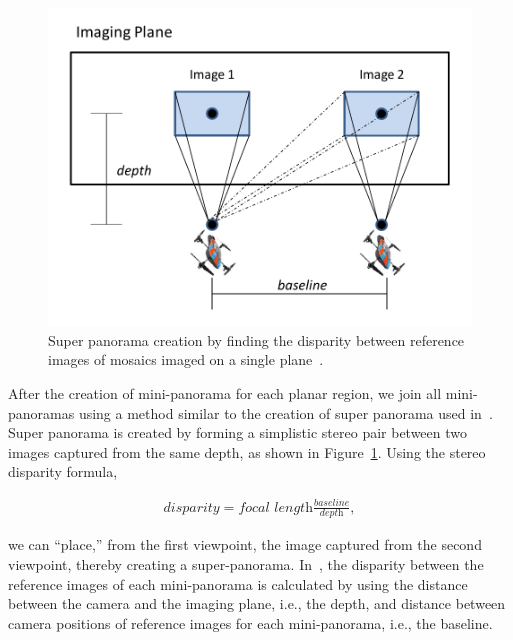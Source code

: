 \begin{figure}[ht!]
\centering
\includegraphics[width=\linewidth]{figures/multiplanar/SinglePlaneMosaic}
\caption{Super panorama creation by finding the disparity between reference
images of mosaics imaged on a single plane~\cite{Prasad16}.}
\label{fig:singlePlaneMosaic}
\end{figure}

After the creation of mini-panorama for each planar region, we join all
mini-panoramas using a method similar to the creation of super panorama used
in~\cite{Prasad16}. Super panorama is created by forming a simplistic stereo
pair between two images captured from the same depth, as shown in
Figure~\ref{fig:singlePlaneMosaic}. Using the stereo disparity formula, 
\begin{ceqn}
\begin{align}
\textit{disparity} = \textit{focal
length}\frac{\textit{baseline}}{\textit{depth}},
\label{eq:disparityOrig}
\end{align}
\end{ceqn}
we can ``place,'' from the first viewpoint, the image captured from the second
viewpoint, thereby creating a super-panorama. In~\cite{Prasad16}, the disparity
between the reference images of each mini-panorama is calculated by using the
distance between the camera and the imaging plane, i.e., the depth, and distance
between camera positions of reference images for each mini-panorama, i.e., the
baseline.

